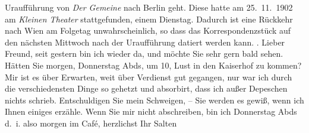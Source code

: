 \begin{ledgroupsized}[t]{13cm}
{{{{                        Uraufführung von \emph{Der Gemeine} nach Berlin geht. Diese
                        hatte am 25. 11. 1902 am \emph{Kleinen Theater}
                        stattgefunden, einem Dienstag. Dadurch ist eine Rückkehr nach Wien am Folgetag unwahrscheinlich,
                        so dass das Korrespondenzstück auf den nächsten Mittwoch nach der Uraufführung datiert
                        werden kann.}}}\label{K_L03337-1h}} . \pend
           \pstart
           Lieber Freund, seit gestern bin ich wieder da, und
               möchte Sie sehr gern bald sehen. Hätten Sie morgen, Donnerstag Abds, um
               10, Lust in den Kaiserhof zu kommen? Mir ist es über
               Erwarten, weit über Verdienst gut gegangen, nur war ich durch die verschiedensten
               Dinge so gehetzt und absorbirt, dass ich außer Depeschen nichts schrieb. \pend
           \pstart
           Entschuldigen Sie mein Schweigen, – Sie werden es
               gewiß, wenn ich Ihnen einiges erzähle. Wenn Sie mir nicht abschreiben, bin ich
               Donnerstag Abds d. i. also morgen im Café, \pend
           \pstart herzlichst Ihr \spacefill\mbox{Salten }\pend{}
         
         \endnumbering{}\end{ledgroupsized}\begin{anhang}\end{anhang}\newcommand{\dateiname}{L03337}\newcommand{\titel}{Felix Salten an Arthur Schnitzler, [3. 12.? 1902]}\newcommand{\editorInnen}{Martin Anton Müller und Laura Untner}
      